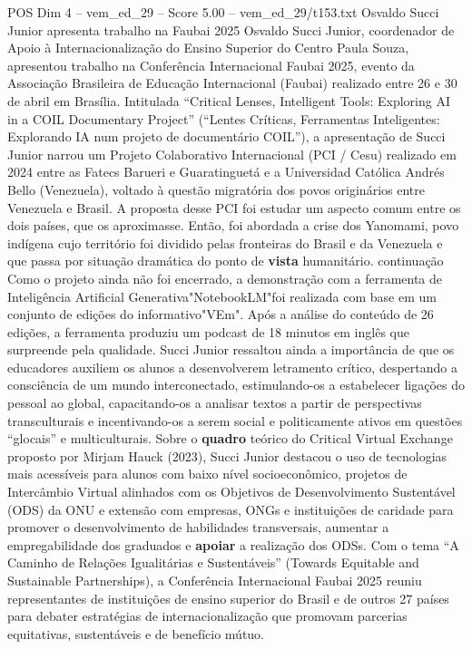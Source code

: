 \begin{textsample}{POS Dim 4 – vem\_ed\_29 – Score 5.00 – vem\_ed\_29/t153.txt}  \label{ex:f4_pos_009}
Osvaldo Succi Junior apresenta trabalho na Faubai 2025 Osvaldo Succi Junior, coordenador de Apoio à Internacionalização do Ensino Superior do Centro Paula Souza, apresentou trabalho na Conferência Internacional Faubai 2025, evento da Associação Brasileira de Educação Internacional (Faubai) realizado entre 26 e 30 de abril em Brasília.
Intitulada “Critical Lenses, Intelligent Tools: Exploring AI in a COIL Documentary Project” (“Lentes Críticas, Ferramentas Inteligentes: Explorando IA num projeto de documentário COIL”), a apresentação de Succi Junior narrou um Projeto Colaborativo Internacional (PCI / Cesu) realizado em 2024 entre as Fatecs Barueri e Guaratinguetá e a Universidad Católica Andrés Bello (Venezuela), voltado à questão migratória dos povos originários entre Venezuela e Brasil.
A proposta desse PCI foi estudar um aspecto comum entre os dois países, que os aproximasse.
Então, foi abordada a crise dos Yanomami, povo indígena cujo território foi dividido pelas fronteiras do Brasil e da Venezuela e que passa por situação dramática do ponto de \textbf{vista} humanitário. continuação Como o projeto ainda não foi encerrado, a demonstração com a ferramenta de Inteligência Artificial Generativa"NotebookLM"foi realizada com base em um conjunto de edições do informativo"VEm".
Após a análise do conteúdo de 26 edições, a ferramenta produziu um podcast de 18 minutos em inglês que surpreende pela qualidade.
Succi Junior ressaltou ainda a importância de que os educadores auxiliem os alunos a desenvolverem letramento crítico, despertando a consciência de um mundo interconectado, estimulando-os a estabelecer ligações do pessoal ao global, capacitando-os a analisar textos a partir de perspectivas transculturais e incentivando-os a serem social e politicamente ativos em questões “glocais” e multiculturais.
Sobre o \textbf{quadro} teórico do Critical Virtual Exchange proposto por Mirjam Hauck (2023), Succi Junior destacou o uso de tecnologias mais acessíveis para alunos com baixo nível socioeconômico, projetos de Intercâmbio Virtual alinhados com os Objetivos de Desenvolvimento Sustentável (ODS) da ONU e extensão com empresas, ONGs e instituições de caridade para promover o desenvolvimento de habilidades transversais, aumentar a empregabilidade dos graduados e \textbf{apoiar} a realização dos ODSs.
Com o tema “A Caminho de Relações Igualitárias e Sustentáveis” (Towards Equitable and Sustainable Partnerships), a Conferência Internacional Faubai 2025 reuniu representantes de instituições de ensino superior do Brasil e de outros 27 países para debater estratégias de internacionalização que promovam parcerias equitativas, sustentáveis e de benefício mútuo.

\end{textsample}
